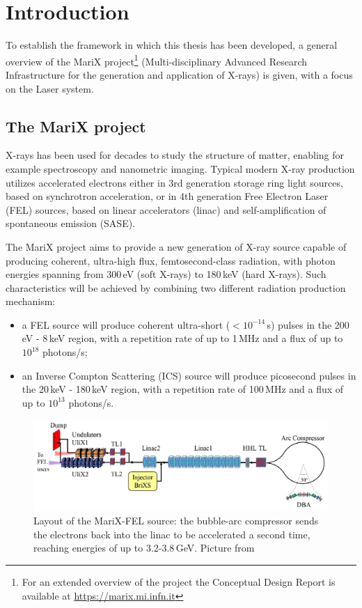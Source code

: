 \chapter{Introduction}
To establish the framework in which this thesis has been developed, a general overview of the MariX project\footnote{For an extended overview of the project the Conceptual Design Report \parencite{CDR} is available at \url{https://marix.mi.infn.it}} (Multi-disciplinary Advanced Research Infrastructure for the generation and application of X-rays) is given, with a focus on the Laser system.
\section{The MariX project}
X-rays has been used for decades to study the structure of matter, enabling for example spectroscopy and nanometric imaging. Typical modern X-ray production utilizes accelerated electrons either in 3rd generation storage ring light sources, based on synchrotron acceleration, or in 4th generation Free Electron Laser (FEL) sources, based on linear accelerators (linac) and self-amplification of spontaneous emission (SASE).

The MariX project aims to provide a new generation of X-ray source capable of producing coherent, ultra-high flux, femtosecond-class radiation, with photon energies spanning from 300\,eV (soft X-rays) to 180\,keV (hard X-rays). Such characteristics will be achieved by combining two different radiation production mechanism:
\begin{itemize}
	\item a FEL source will produce coherent ultra-short ($<10^{-14}$\,s) pulses in the 200\,eV - 8\,keV region, with a repetition rate of up to 1\,MHz and a flux of up to $10^{18}$ photons/s;
	\item an Inverse Compton Scattering (ICS) source will produce picosecond pulses in the 20\,keV - 180\,keV region, with a repetition rate of 100\,MHz and a flux of up to $10^{13}$ photons/s.
\end{itemize}
\begin{figure}
	\centering
	\includegraphics[width=0.9\linewidth]{images/fel.png}
	\caption{Layout of the MariX-FEL source: the bubble-arc compressor sends the electrons back into the linac to be accelerated a second time, reaching energies of up to 3.2-3.8\,GeV. Picture from \parencite{CDR}}
	\label{fig:fel}
\end{figure}


